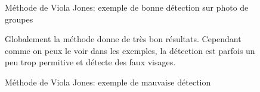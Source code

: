 \documentclass{article}
\begin{document}
\begin{figure}[h!]
  \centering
  \hfill

  \caption{Méthode de Viola Jones: exemple de bonne détection sur photo de groupes}
\end{figure}


\begin{figure}[h!]
  \centering
  \hfill

  \caption{Méthode de Viola Jones: exemple de mauvaise détection}


Globalement la méthode donne de très bon résultats. Cependant comme on peux le voir dans les exemples, la détection est parfois un peu trop permitive et détecte des faux visages.
\end{figure}
\end{document}

